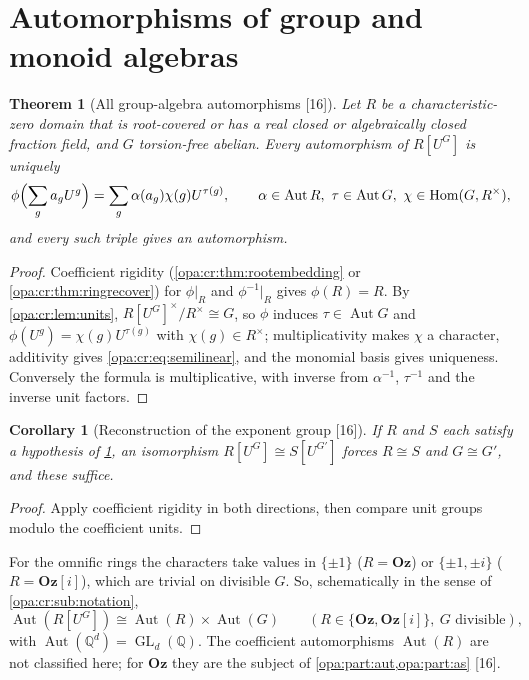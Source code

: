 \documentclass[11pt,oneside]{article}
\numberwithin{equation}{section}
\newtheorem{theorem}{Theorem}[section]
\newtheorem{corollary}[corollary]{Corollary}
\theoremstyle{definition}
\theoremstyle{remark}
\newcommand{\Oz}{\mathbf{Oz}}
\newcommand{\Og}{\mathbf{Oz}[i]}
\newcommand{\Q}{\mathbb Q}
\newcommand{\Aut}{\operatorname{Aut}}
\newcommand{\Hom}{\operatorname{Hom}}
\newcommand{\GL}{\operatorname{GL}}
\newcommand{\src}[1]{\textup{\textsf{\small[#1]}}}
\begin{document}
\section{Automorphisms of group and monoid algebras}\label{opa:cr:sec:ringautos}

\begin{theorem}[All group-algebra automorphisms \src{16}]\label{opa:cr:thm:ringautos}
Let $R$ be a characteristic-zero domain that is root-covered or has a real closed or algebraically closed fraction
field, and $G$ torsion-free abelian. Every automorphism of $R[U^G]$ is uniquely
\begin{equation}\label{opa:cr:eq:semilinear}
 \phi\Bigl(\sum_ga_gU^g\Bigr)=\sum_g\alpha(a_g)\chi(g)U^{\tau(g)},\qquad\alpha\in\Aut R,\ \tau\in\Aut G,\ \chi\in\Hom(G,R^\times),
\end{equation}
and every such triple gives an automorphism.
\end{theorem}
\begin{proof}
Coefficient rigidity (\cref{opa:cr:thm:rootembedding} or \cref{opa:cr:thm:ringrecover}) for $\phi|_R$ and $\phi^{-1}|_R$ gives
$\phi(R)=R$. By \cref{opa:cr:lem:units}, $R[U^G]^\times/R^\times\cong G$, so $\phi$ induces $\tau\in\Aut G$ and
$\phi(U^g)=\chi(g)U^{\tau(g)}$ with $\chi(g)\in R^\times$; multiplicativity makes $\chi$ a character, additivity gives
\eqref{opa:cr:eq:semilinear}, and the monomial basis gives uniqueness. Conversely the formula is multiplicative, with
inverse from $\alpha^{-1}$, $\tau^{-1}$ and the inverse unit factors.
\end{proof}

\begin{corollary}[Reconstruction of the exponent group \src{16}]\label{opa:cr:cor:ringgroup}
If $R$ and $S$ each satisfy a hypothesis of \cref{opa:cr:thm:ringautos}, an isomorphism $R[U^G]\cong S[U^{G'}]$ forces
$R\cong S$ and $G\cong G'$, and these suffice.
\end{corollary}
\begin{proof}
Apply coefficient rigidity in both directions, then compare unit groups modulo the coefficient units.
\end{proof}

For the omnific rings the characters take values in $\{\pm1\}$ ($R=\Oz$) or $\{\pm1,\pm i\}$ ($R=\Og$), which are
trivial on divisible $G$. So, schematically in the sense of \cref{opa:cr:sub:notation},
\begin{equation}\label{opa:cr:eq:ozdirect}
 \Aut(R[U^G])\cong\Aut(R)\times\Aut(G)\qquad(R\in\{\Oz,\Og\},\ G\text{ divisible}),
\end{equation}
with $\Aut(\Q^d)=\GL_d(\Q)$. The coefficient automorphisms $\Aut(R)$ are not classified here; for $\Oz$ they are the
subject of \cref{opa:part:aut,opa:part:as} \src{16}.
\end{document}

